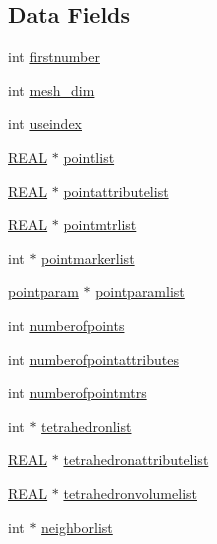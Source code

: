 \subsection*{Data Fields}
\begin{DoxyCompactItemize}
\item 
int \hyperlink{classtetgenio_ace3ae3f90741f8e51e02f5007d81e440}{firstnumber}
\item 
int \hyperlink{classtetgenio_a79a469ad1e88f5830d2fcefe9a8ca53f}{mesh\+\_\+dim}
\item 
int \hyperlink{classtetgenio_ae95528b3d4525a3584dd26cadb8035ad}{useindex}
\item 
\hyperlink{tetgen_8h_a4b654506f18b8bfd61ad2a29a7e38c25}{R\+E\+AL} $\ast$ \hyperlink{classtetgenio_a69b1e0f645f57281d838569c2bbc5789}{pointlist}
\item 
\hyperlink{tetgen_8h_a4b654506f18b8bfd61ad2a29a7e38c25}{R\+E\+AL} $\ast$ \hyperlink{classtetgenio_a4273b235ec6260723bae849c3184ae6f}{pointattributelist}
\item 
\hyperlink{tetgen_8h_a4b654506f18b8bfd61ad2a29a7e38c25}{R\+E\+AL} $\ast$ \hyperlink{classtetgenio_adc248b0a839167ad5389711798613114}{pointmtrlist}
\item 
int $\ast$ \hyperlink{classtetgenio_afc154d429cb5344b1ea12318b094a2c8}{pointmarkerlist}
\item 
\hyperlink{structtetgenio_1_1pointparam}{pointparam} $\ast$ \hyperlink{classtetgenio_ab7bc1e01d32b9c2f9537ccecac5a4a04}{pointparamlist}
\item 
int \hyperlink{classtetgenio_a5211bec795ba870c01fadade4cd8670f}{numberofpoints}
\item 
int \hyperlink{classtetgenio_a3d263e577de1fa81296abe9a6ba029b0}{numberofpointattributes}
\item 
int \hyperlink{classtetgenio_a1a62cf8c03758eb3e1920c6c506c1a64}{numberofpointmtrs}
\item 
int $\ast$ \hyperlink{classtetgenio_ae53a07184487b2635d0f332ff818d938}{tetrahedronlist}
\item 
\hyperlink{tetgen_8h_a4b654506f18b8bfd61ad2a29a7e38c25}{R\+E\+AL} $\ast$ \hyperlink{classtetgenio_aeae735f4584f63311f1c9d46530eefe1}{tetrahedronattributelist}
\item 
\hyperlink{tetgen_8h_a4b654506f18b8bfd61ad2a29a7e38c25}{R\+E\+AL} $\ast$ \hyperlink{classtetgenio_a1fe58bef7f029f7b84a8541851547382}{tetrahedronvolumelist}
\item 
int $\ast$ \hyperlink{classtetgenio_ab79a85fdffb1ab3f93ff3645fb604d40}{neighborlist}
\item 

\end{DoxyCompactItemize}
